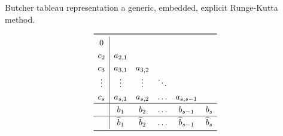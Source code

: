 \begin{table}[htpb]
    \centering
    \caption[Butcher tableau representation of a generic, embedded, explicit
    Runge-Kutta method]
    {Butcher tableau representation a generic, embedded, explicit Runge-Kutta
    method.}
    \label{tab:genericembeddedbutcher}
    \[\renewcommand{\arraystretch}{1.25}
    \begin{array}{c|ccccc}
    \toprule
    0 \\
    c_{2} & a_{2,1} \\
    c_{3} & a_{3,1} & a_{3,2} \\
    \vdots & \vdots & \vdots & \ddots\\
    c_{s} & a_{s,1} & a_{s,2} & \ldots & a_{s,s-1}\\
    \hline
    & b_{1} & b_{2} & \ldots & b_{s-1} & b_{s} \\
    \hline
    & \widehat{b}_{1} & \widehat{b}_{2} & \ldots & \widehat{b}_{s-1} %
    & \widehat{b}_{s}\\
    \bottomrule
    \end{array}
\]
\end{table}
